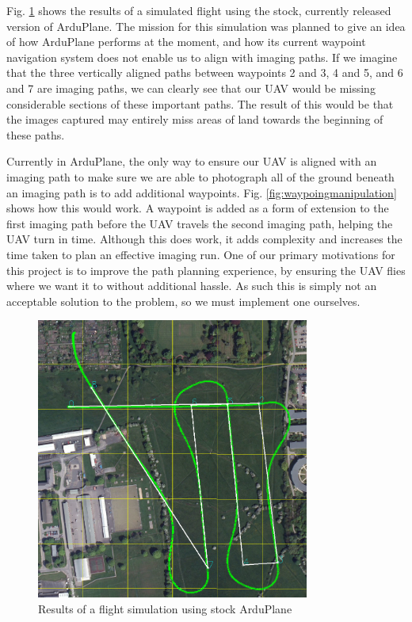 Fig. \ref{fig:baseArduPlane} shows the results of a simulated flight using the stock, currently released version of ArduPlane. The mission for this simulation was planned to give an idea of how ArduPlane performs at the moment, and how its current waypoint navigation system does not enable us to align with imaging paths. If we imagine that the three vertically aligned paths between waypoints 2 and 3, 4 and 5, and 6 and 7 are imaging paths, we can clearly see that our UAV would be missing considerable sections of these important paths. The result of this would be that the images captured may entirely miss areas of land towards the beginning of these paths. 

Currently in ArduPlane, the only way to ensure our UAV is aligned with an imaging path to make sure we are able to photograph all of the ground beneath an imaging path is to add additional waypoints. Fig. \ref{fig:waypoingmanipulation} shows how this would work. A waypoint is added as a form of extension to the first imaging path before the UAV travels the second imaging path, helping the UAV turn in time. Although this does work, it adds complexity and increases the time taken to plan an effective imaging run. One of our primary motivations for this project is to improve the path planning experience, by ensuring the UAV flies where we want it to without additional hassle. As such this is simply not an acceptable solution to the problem, so we must implement one ourselves.

\begin{figure}[htbp!] 
\centering    
\includegraphics[width=0.8\textwidth]{BaseArduPlane}
\caption[Stock ArduPlane Path Tracking]{Results of a flight simulation using stock ArduPlane}
\label{fig:baseArduPlane}
\end{figure}

